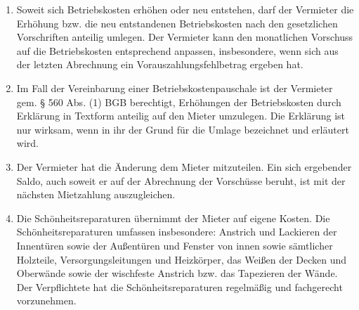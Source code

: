 \documentclass{scrreprt}[12pt,a4paper,twoside,duplex]
\begin{document}
\begin{contract}
\begin{enumerate}
\begin{multicols}{2}
\begin{enumerate}[label*=\arabic*\,)]
      \item Die Kosten der Sach- und Haft\-pflicht\-ver\-si\-che\-rung
      \item Die Kosten für den Hauswart
      \item Die Kosten des Betriebs der Gemeinschafts-Antennenanlage oder der mit
      einem Breitbandkabelnetz verbundenen privaten Verteilanlage
      \item Die Kosten der Dachrinnenreinigung
      \item Sonstige Betriebskosten
      \item Umlageausfallwagnis
      \item Heizung und Warmwasserversorgung
    \end{enumerate}
  \end{multicols}
  \item Soweit sich Betriebskosten erhöhen oder neu entstehen, darf der
  Vermieter die Erhöhung bzw. die neu entstandenen Betriebskosten nach den
  gesetzlichen Vorschriften anteilig umlegen. Der Vermieter kann den monatlichen
  Vorschuss auf die Betriebskosten entsprechend anpassen, insbesondere, wenn
  sich aus der letzten Abrechnung ein Vorauszahlungsfehlbetrag ergeben hat.
  \item Im Fall der Vereinbarung einer Betriebskostenpauschale ist der Vermieter
  gem. § 560 Abs. (1) BGB berechtigt, Erhöhungen der Betriebskosten durch
  Erklärung in Textform anteilig auf den Mieter umzulegen. Die Erklärung ist nur
  wirksam, wenn in ihr der Grund für die Umlage bezeichnet und erläutert wird.
  \item Der Vermieter hat die Änderung dem Mieter mitzuteilen. Ein sich
  ergebender Saldo, auch soweit er auf der Abrechnung der Vorschüsse beruht,
  ist mit der nächsten Mietzahlung auszugleichen.
  \item Die Schönheitsreparaturen übernimmt der Mieter auf eigene Kosten.
  Die Schön\-heits\-re\-pa\-ra\-tu\-ren umfassen insbesondere:
  Anstrich und Lackieren der Innentüren sowie der Außentüren und Fenster von
  innen sowie sämtlicher Holzteile, Versorgungsleitungen und Heizkörper, das
  Weißen der Decken und Oberwände sowie der wischfeste Anstrich bzw. das
  Tapezieren der Wände. Der Verpflichtete hat die
  Schön\-heits\-re\-pa\-ra\-tu\-ren regelmäßig und fachgerecht vorzunehmen.

\end{enumerate}
\end{contract}
\end{document}
